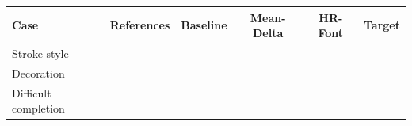 \begingroup\small
\setlength{\tabcolsep}{7pt}
\begin{tabular}{lccccc}
\toprule
Case & References & Baseline & Mean-Delta & HR-Font & Target\\
\midrule
Stroke style & \rule{0pt}{22pt} & & & &\\
Decoration & \rule{0pt}{22pt} & & & &\\
Difficult completion & \rule{0pt}{22pt} & & & &\\
\bottomrule
\end{tabular}
\endgroup
